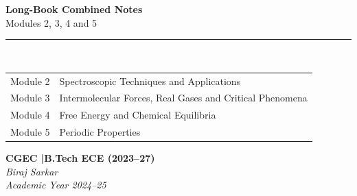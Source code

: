 \documentclass[12pt,a4paper]{article}
\newcommand{\moduletitle}{Combined Notes}
\begin{document}
\begin{center}
  \begin{tcolorbox}[
    colback=white, colframe=myred, boxrule=2pt, arc=8pt,
    left=18pt, right=18pt, top=16pt, bottom=16pt,
    width=\linewidth]
    \centering
    {\LARGE\bfseries\color{myred} Long-Book Combined Notes}\\[8pt]
    {\large\color{mydark} Modules 2, 3, 4 and 5}\\[10pt]
    {\color{myred}\rule{0.6\linewidth}{0.8pt}}\\[10pt]
    \begin{tabularx}{0.88\linewidth}{B{3.2cm} Y}
      Module 2 & Spectroscopic Techniques and Applications \\[4pt]
      Module 3 & Intermolecular Forces, Real Gases and Critical Phenomena \\[4pt]
      Module 4 & Free Energy and Chemical Equilibria \\[4pt]
      Module 5 & Periodic Properties \\
    \end{tabularx}
  \end{tcolorbox}
\end{center}

\vspace{1.4cm}

\begin{center}
  \begin{tcolorbox}[
    colback=hdrteal, colframe=myteal, boxrule=1.2pt, arc=6pt,
    left=14pt, right=14pt, top=10pt, bottom=10pt,
    width=0.72\linewidth]
    \centering
    {\normalsize\bfseries\color{mydark} CGEC \quad|\quad B.Tech ECE (2023--27)}\\[5pt]
    {\normalsize\color{mydark}\textit{Biraj Sarkar}}\\[5pt]
    {\small\color{myteal}\textit{Academic Year 2024--25}}
  \end{tcolorbox}
\end{center}

\vfill\vspace*{3.2cm}  %

\newpage

\thispagestyle{fancy}
\renewcommand{\moduletitle}{Table of Contents}
\hypersetup{linkcolor=mydark}
\tableofcontents
\hypersetup{linkcolor=myteal}
\end{document}

